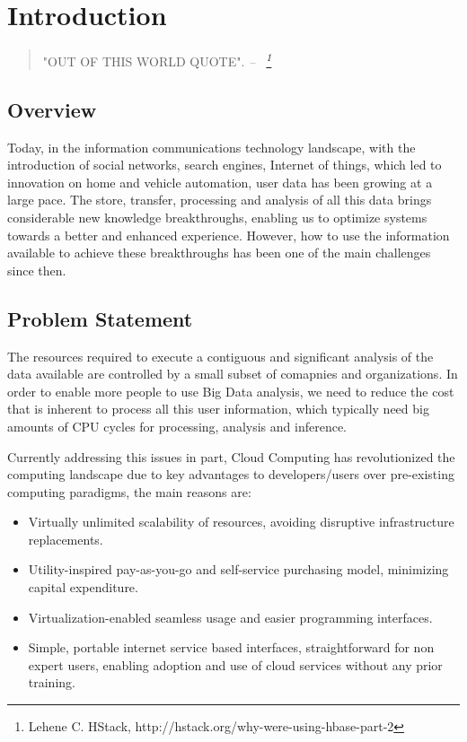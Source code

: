 \chapter{Introduction}\label{ch:intro}

\begin{quotation}
    "OUT OF THIS WORLD QUOTE".
    {\small\it 
        -- ~\footnote{Lehene C. HStack, http://hstack.org/why-were-using-hbase-part-2} }
\end{quotation}

\section{Overview}

Today, in the information communications technology landscape, with the introduction of social networks, search engines, Internet of things, which led to innovation on home and vehicle automation, user data has been growing at a large pace. The store, transfer, processing and analysis of all this data brings considerable new knowledge breakthroughs, enabling us to optimize systems towards a better and enhanced experience. However, how to use the information available to achieve these breakthroughs has been one of the main challenges since then. 

\section{Problem Statement}

The resources required to execute a contiguous and significant analysis of the data available are controlled by a small subset of comapnies and organizations. In order to enable more people to use Big Data analysis, we need to reduce the cost that is inherent to process all this user information, which typically need big amounts of CPU cycles for processing, analysis and inference.

Currently addressing this issues in part, Cloud Computing has revolutionized the computing landscape due to key advantages to developers/users over pre-existing computing paradigms, the main reasons are:

\begin{itemize}
    \item Virtually unlimited scalability of resources, avoiding disruptive infrastructure replacements.
    \item Utility-inspired pay-as-you-go and self-service purchasing model, minimizing capital expenditure.
    \item Virtualization-enabled seamless usage and easier programming interfaces.
    \item Simple, portable internet service based interfaces, straightforward for non expert users, enabling adoption and use of cloud services without any prior training.
\end{itemize}

